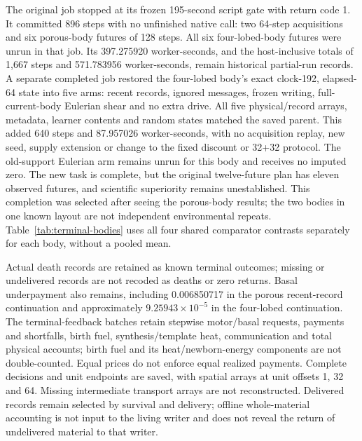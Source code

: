 The original job stopped at its frozen 195-second script gate with return code 1. It committed 896 steps with no unfinished native call: two 64-step acquisitions and six porous-body futures of 128 steps. All six four-lobed-body futures were unrun in that job. Its 397.275920 worker-seconds, and the host-inclusive totals of 1,667 steps and 571.783956 worker-seconds, remain historical partial-run records. A separate completed job restored the four-lobed body's exact clock-192, elapsed-64 state into five arms: recent records, ignored messages, frozen writing, full-current-body Eulerian shear and no extra drive. All five physical/record arrays, metadata, learner contents and random states matched the saved parent. This added 640 steps and 87.957026 worker-seconds, with no acquisition replay, new seed, supply extension or change to the fixed discount or 32+32 protocol. The old-support Eulerian arm remains unrun for this body and receives no imputed zero. The new task is complete, but the original twelve-future plan has eleven observed futures, and scientific superiority remains unestablished. This completion was selected after seeing the porous-body results; the two bodies in one known layout are not independent environmental repeats. Table~\ref{tab:terminal-bodies} uses all four shared comparator contrasts separately for each body, without a pooled mean.

Actual death records are retained as known terminal outcomes; missing or undelivered records are not recoded as deaths or zero returns. Basal underpayment also remains, including 0.006850717 in the porous recent-record continuation and approximately $9.25943\times10^{-5}$ in the four-lobed continuation. The terminal-feedback batches retain stepwise motor/basal requests, payments and shortfalls, birth fuel, synthesis/template heat, communication and total physical accounts; birth fuel and its heat/newborn-energy components are not double-counted. Equal prices do not enforce equal realized payments. Complete decisions and unit endpoints are saved, with spatial arrays at unit offsets 1, 32 and 64. Missing intermediate transport arrays are not reconstructed. Delivered records remain selected by survival and delivery; offline whole-material accounting is not input to the living writer and does not reveal the return of undelivered material to that writer.

